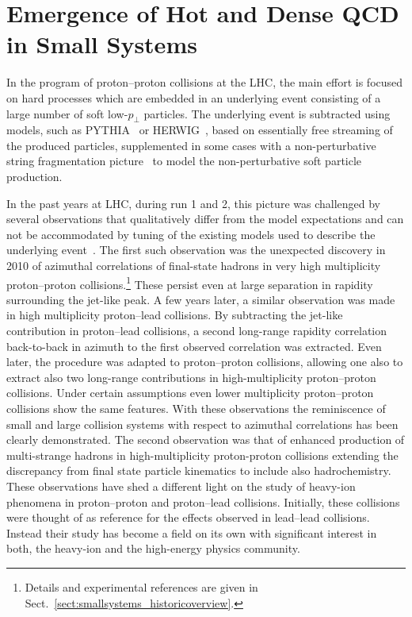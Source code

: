 \documentclass[../report.tex]{subfiles}
\begin{document}
\section{Emergence of Hot and Dense QCD in Small Systems}
In the program of proton--proton collisions at the LHC, the main effort is focused on hard processes which are embedded in an underlying event consisting of a large number of soft low-$p_\perp$ particles. The underlying event is subtracted using models, such as PYTHIA~\cite{Sjostrand:2014zea} or HERWIG~\cite{Bellm:2015jjp}, based on essentially free streaming of the produced particles, supplemented in some cases with a non-perturbative string fragmentation picture~\cite{Andersson:1983ia} to model the non-perturbative soft particle production.  

In the past years at LHC, during run 1 and 2, this picture was challenged by several observations that qualitatively differ from the model expectations and can not be accommodated by tuning of the existing models used to describe the underlying event~\cite{Fischer:2016zzs}.
The first such observation was the unexpected discovery in 2010 of azimuthal correlations of final-state hadrons in very high multiplicity proton--proton collisions.\footnote{Details and experimental references are given in Sect.~\ref{sect:smallsystems_historicoverview}.} These persist even at large separation in rapidity surrounding the jet-like peak. A few years later, a similar observation was made in high multiplicity proton--lead collisions. By subtracting the jet-like contribution in proton--lead collisions, a second long-range rapidity correlation back-to-back in azimuth to the first observed correlation was extracted. Even later, the procedure was adapted to proton--proton collisions, allowing one also to extract also two long-range contributions in high-multiplicity proton--proton collisions. Under certain assumptions even lower multiplicity proton--proton collisions show the same features. With these observations the reminiscence  of small and large collision systems with respect to azimuthal correlations has been clearly demonstrated.
The second observation was that of enhanced production of multi-strange hadrons in high-multiplicity proton-proton collisions extending the discrepancy from final state particle kinematics to include also hadrochemistry. 
These observations have shed a different light on the study of heavy-ion phenomena in proton--proton and proton--lead collisions. Initially, these collisions were thought of as reference for the effects observed in lead--lead collisions. Instead their study has become a field on its own with significant interest in both, the heavy-ion and the high-energy physics community.
\end{document}
